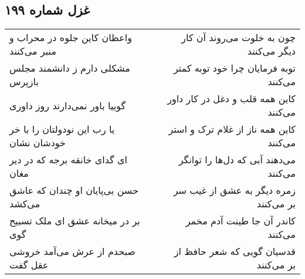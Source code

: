 \begin{center}
\section*{غزل شماره ۱۹۹}
\label{sec:sh199}
\begin{longtable}{l p{0.5cm} r}
واعظان کاین جلوه در محراب و منبر می‌کنند
&&
چون به خلوت می‌روند آن کار دیگر می‌کنند
\\
مشکلی دارم ز دانشمند مجلس بازپرس
&&
توبه فرمایان چرا خود توبه کمتر می‌کنند
\\
گوییا باور نمی‌دارند روز داوری
&&
کاین همه قلب و دغل در کار داور می‌کنند
\\
یا رب این نودولتان را با خر خودشان نشان
&&
کاین همه ناز از غلام ترک و استر می‌کنند
\\
ای گدای خانقه برجه که در دیر مغان
&&
می‌دهند آبی که دل‌ها را توانگر می‌کنند
\\
حسن بی‌پایان او چندان که عاشق می‌کشد
&&
زمره دیگر به عشق از غیب سر بر می‌کنند
\\
بر در میخانه عشق ای ملک تسبیح گوی
&&
کاندر آن جا طینت آدم مخمر می‌کنند
\\
صبحدم از عرش می‌آمد خروشی عقل گفت
&&
قدسیان گویی که شعر حافظ از بر می‌کنند
\\
\end{longtable}
\end{center}

